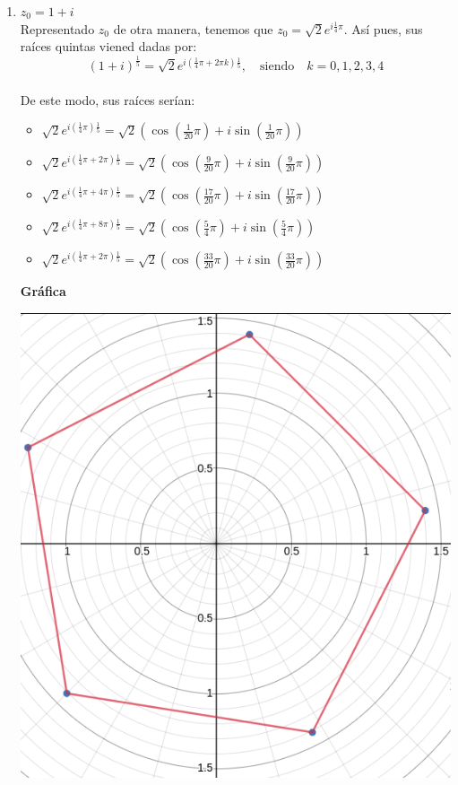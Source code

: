\documentclass[a4paper,12pt]{article}
\begin{document}
\begin{enumerate}
\begin{enumerate}
            \item $z_0 = 1+i$\\
            Representado $z_0$ de otra manera, tenemos que $z_0= \sqrt{2}e^{i\frac{1}{4}\pi}$. Así pues, sus raíces quintas viened dadas por:\\
            $$(1+i)^{\frac{1}{5}} = \sqrt{2}e^{i\left(\frac{1}{4}\pi + 2\pi k\right)\frac{1}{5}}, \quad \textrm{siendo} \quad k = 0,1,2,3,4$$\\
            De este modo, sus raíces serían:
            \begin{itemize}
                \item $\sqrt{2}e^{i\left(\frac{1}{4}\pi \right)\frac{1}{5}} = \sqrt{2}\left( \cos\left(\frac{1}{20}\pi\right) + i \sin\left({\frac{1}{20}\pi}\right)\right)$
                \item $\sqrt{2}e^{i\left(\frac{1}{4}\pi + 2\pi \right)\frac{1}{5}} = \sqrt{2}\left( \cos\left(\frac{9}{20}\pi\right) + i \sin\left({\frac{9}{20}\pi}\right)\right)$
                \item $\sqrt{2}e^{i\left(\frac{1}{4}\pi + 4\pi \right)\frac{1}{5}} = \sqrt{2}\left( \cos\left(\frac{17}{20}\pi\right) + i \sin\left({\frac{17}{20}\pi}\right)\right)$
                \item $\sqrt{2}e^{i\left(\frac{1}{4}\pi + 8\pi \right)\frac{1}{5}} = \sqrt{2}\left( \cos\left(\frac{5}{4}\pi\right) + i \sin\left({\frac{5}{4}\pi}\right)\right)$
                \item $\sqrt{2}e^{i\left(\frac{1}{4}\pi + 2\pi \right)\frac{1}{5}} = \sqrt{2}\left( \cos\left(\frac{33}{20}\pi\right) + i \sin\left({\frac{33}{20}\pi}\right)\right)$
            \end{itemize}
            \textbf{Gráfica}
            \begin{center}
            \includegraphics[scale=0.4]{16-b.png}  
            \end{center}
             

\end{enumerate}
\end{enumerate}
\end{document}
